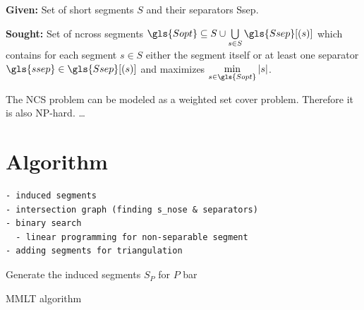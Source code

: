 \begin{problem}
  \hfill
  \begin{labeling}{\hspace{4em}}
    \item[\textbf{Given:}]
      Set of short segments \(S\) and their separators \gls{Ssep}.
    \item[\textbf{Sought:}]
      Set of \gls{ncross} segments \(\gls{Sopt} \subseteq S \cup
      \bigcup\limits_{s \in S} \gls{Ssep}[(s)] \) which contains
      for each segment \(s \in S\) either the segment itself or at
      least one separator \(\gls{ssep} \in \gls{Ssep}[(s)]\) and
      maximizes \(\min\limits_{s \in \gls{Sopt}} |s|\).
  \end{labeling}
\end{problem}

The \gls{NCS} problem can be modeled as a weighted set cover problem. 
Therefore it is also NP-hard. 
\ldots



\section{Algorithm}

\begin{verbatim}
- induced segments
- intersection graph (finding s_nose & separators)
- binary search
  - linear programming for non-separable segment
- adding segments for triangulation
\end{verbatim}

\begin{algorithm}
\DontPrintSemicolon
{}
Generate the induced segments \(S_P\) for \(P\) \;
bar \;
\caption{\gls{MMLT} algorithm}
\end{algorithm}
